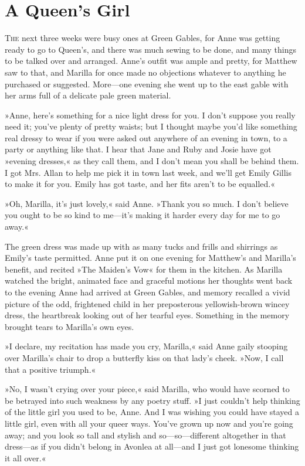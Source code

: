 \chapter{A Queen’s Girl}

\lettrine[lines=4]{T}{he} next three weeks were busy ones at Green Gables, for Anne was getting ready to go to Queen’s, and there was much sewing to be done, and many things to be talked over and arranged. Anne’s outfit was ample and pretty, for Matthew saw to that, and Marilla for once made no objections whatever to anything he purchased or suggested. More—one evening she went up to the east gable with her arms full of a delicate pale green material.

»Anne, here’s something for a nice light dress for you. I don’t suppose you really need it; you’ve plenty of pretty waists; but I thought maybe you’d like something real dressy to wear if you were asked out anywhere of an evening in town, to a party or anything like that. I hear that Jane and Ruby and Josie have got »evening dresses,« as they call them, and I don’t mean you shall be behind them. I got Mrs. Allan to help me pick it in town last week, and we’ll get Emily Gillis to make it for you. Emily has got taste, and her fits aren’t to be equalled.«

»Oh, Marilla, it’s just lovely,« said Anne. »Thank you so much. I don’t believe you ought to be so kind to me—it’s making it harder every day for me to go away.«

The green dress was made up with as many tucks and frills and shirrings as Emily’s taste permitted. Anne put it on one evening for Matthew’s and Marilla’s benefit, and recited »The Maiden’s Vow« for them in the kitchen. As Marilla watched the bright, animated face and graceful motions her thoughts went back to the evening Anne had arrived at Green Gables, and memory recalled a vivid picture of the odd, frightened child in her preposterous yellowish-brown wincey dress, the heartbreak looking out of her tearful eyes. Something in the memory brought tears to Marilla’s own eyes.

»I declare, my recitation has made you cry, Marilla,« said Anne gaily stooping over Marilla’s chair to drop a butterfly kiss on that lady’s cheek. »Now, I call that a positive triumph.«

»No, I wasn’t crying over your piece,« said Marilla, who would have scorned to be betrayed into such weakness by any poetry stuff. »I just couldn’t help thinking of the little girl you used to be, Anne. And I was wishing you could have stayed a little girl, even with all your queer ways. You’ve grown up now and you’re going away; and you look so tall and stylish and so—so—different altogether in that dress—as if you didn’t belong in Avonlea at all—and I just got lonesome thinking it all over.«

